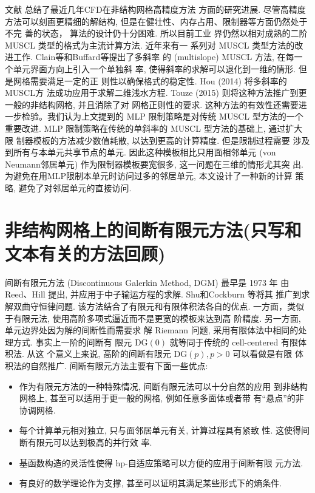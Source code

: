 文献 \cite{Wang2007,Wang2013} 总结了最近几年CFD在非结构网格高精度方法
方面的研究进展. 尽管高精度方法可以刻画更精细的解结构, 但是在健壮性、内存占用、限制器等方面仍然处于不完
善的状态， 算法的设计仍十分困难. 所以目前工业
界仍然以相对成熟的二阶 MUSCL 类型的格式为主流计算方法. 近年来有一
系列对 MUSCL 类型方法的改进工作. Clain等\cite{Clain2010}和Buffard\cite{Clain2010,Buffard2010}等提出了多斜率
的 (multislope) MUSCL 方法, 在每一个单元界面方向上引入一个单独斜
率, 使得斜率的求解可以退化到一维的情形. 但是网格需要满足一定的正
则性以确保格式的稳定性. Hou (2014)\cite{Hou2015} 将多斜率的 MUSCL方
法成功应用于求解二维浅水方程. Touze (2015)\cite{LeTouze2015} 则将这种方法推广到更一般的非结构网格, 并且消除了对
网格正则性的要求. 这种方法的有效性还需要进一步检验。我们认为上文提到的 MLP 限制策略是对传统 MUSCL 型方法的一个重要改进. MLP 限制策略在传统的单斜率的 MUSCL 型方法的基础上, 通过扩大限
制器模板的方法减少数值耗散, 以达到更高的计算精度. 但是限制过程需要
涉及到所有与本单元共享节点的单元.  因此这种模板相比只用面相邻单元 (von
Neumann邻居单元) 作为限制器模板要宽很多, 这一问题在三维的情形尤其突
出. 为避免在用MLP限制本单元时访问过多的邻居单元, 本文设计了一种新的计算
策略, 避免了对邻居单元的直接访问.

\section{非结构网格上的间断有限元方法({\color{red}只写和文本有关的方法回顾)} }
\label{sec:dg-method}

间断有限元方法 (Discontinuous Galerkin Method, DGM) 最早是 1973 年
由 Reed、Hill \cite{Reed1973} 提出, 并应用于中子输运方程的求解.
Shu和Cockburn \cite{Cockburn1989,Cockburn1990,Cockburn1998}等将其
推广到求解双曲守恒律问题. 该方法结合了有限元和有限体积法各自的优点.
一方面，类似于有限元法, 使用高阶多项式逼近而不是更宽的模板来达到高
阶精度.  另一方面, 单元边界处因为解的间断性而需要求
解 Riemann 问题, 采用有限体法中相同的处理方式. 事实上一阶的间断有
限元 $\text{DG}(0)$ 就等同于传统的 cell-centered 有限体积法.  从这
个意义上来说, 高阶的间断有限元 $\text{DG}(p), p>0$ 可以看做是有限
体积法的自然推广. 间断有限元方法主要有下面一些优点:
\begin{itemize}
\item 作为有限元方法的一种特殊情况, 间断有限元法可以十分自然的应用
  到非结构网格上, 甚至可以适用于更一般的网格, 例如任意多面体或者带
  有``悬点''的非协调网格.
\item 每个计算单元相对独立, 只与面邻居单元有关, 计算过程具有紧致
  性. 这使得间断有限元可以达到极高的并行效
  率\cite{Juan2009,Remacle2003,Biswas1994}.
\item 基函数构造的灵活性使得 hp-自适应策略可以方便的应用于间断有限
  元方法.
\item 有良好的数学理论作为支撑, 甚至可以证明其满足某些形式下的熵条件\cite{Jiang1994,Hou2006}.
\end{itemize}

